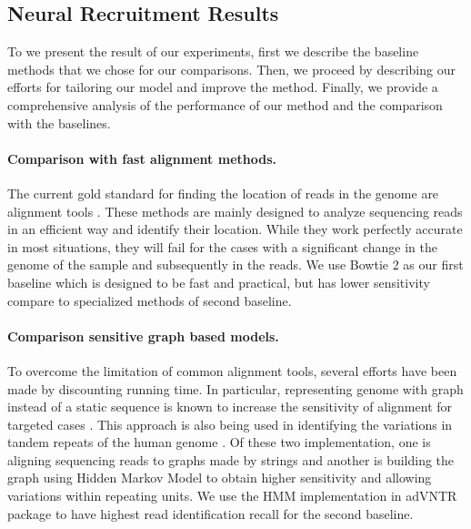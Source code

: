 \subsection{Neural Recruitment Results}
To we present the result of our experiments, first we describe the baseline methods that we chose for our comparisons. Then, we proceed by describing our efforts for tailoring our model and improve the method. Finally, we provide a comprehensive analysis of the performance of our method and the comparison with the baselines.

\paragraph{Comparison with fast alignment methods.}
The current gold standard for finding the location of reads in the genome are alignment tools \cite{Langmead2012}. These methods are mainly designed to analyze sequencing reads in an efficient way and identify their location. While they work perfectly accurate in most situations, they will fail for the cases with a significant change in the genome of the sample and subsequently in the reads. We use Bowtie 2 as our first baseline which is designed to be fast and practical, but has lower sensitivity compare to specialized methods of second baseline.

\paragraph{Comparison sensitive graph based models.}
To overcome the limitation of common alignment tools, several efforts have been made by discounting running time. In particular, representing genome with graph instead of a static sequence is known to increase the sensitivity of alignment for targeted cases \cite{Rakocevic2019}. This approach is also being used in identifying the variations in tandem repeats of the human genome \cite{Bakhtiari2018, Dolzhenko2019}. Of these two implementation, one is aligning sequencing reads to graphs made by strings and another is building the graph using Hidden Markov Model to obtain higher sensitivity and allowing variations within repeating units. We use the HMM implementation in adVNTR package to have highest read identification recall for the second baseline.

